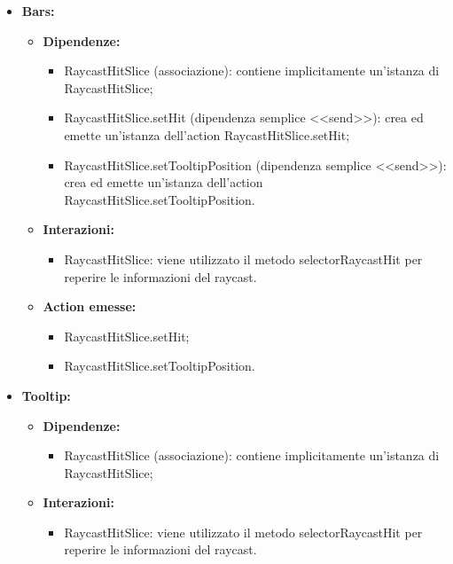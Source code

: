 \begin{itemize}
    \item \textbf{Bars:}
          \begin{itemize}
              \item \textbf{Dipendenze:}
                    \begin{itemize}
                        \item RaycastHitSlice (associazione): contiene implicitamente un'istanza di
                              RaycastHitSlice;
                        \item RaycastHitSlice.setHit (dipendenza semplice <<send>>): crea ed emette
                              un'istanza dell'action RaycastHitSlice.setHit;
                        \item RaycastHitSlice.setTooltipPosition (dipendenza semplice <<send>>): crea ed
                              emette un'istanza dell'action RaycastHitSlice.setTooltipPosition.
                    \end{itemize}
              \item \textbf{Interazioni:}
                    \begin{itemize}
                        \item RaycastHitSlice: viene utilizzato il metodo selectorRaycastHit per reperire le
                              informazioni del raycast.
                    \end{itemize}
              \item \textbf{Action emesse:}
                    \begin{itemize}
                        \item RaycastHitSlice.setHit;
                        \item RaycastHitSlice.setTooltipPosition.
                    \end{itemize}
          \end{itemize}

    \item \textbf{Tooltip:}
          \begin{itemize}
              \item \textbf{Dipendenze:}
                    \begin{itemize}
                        \item RaycastHitSlice (associazione): contiene implicitamente un'istanza di
                              RaycastHitSlice;
                    \end{itemize}
              \item \textbf{Interazioni:}
                    \begin{itemize}
                        \item RaycastHitSlice: viene utilizzato il metodo selectorRaycastHit per reperire le
                              informazioni del raycast.
                    \end{itemize}
          \end{itemize}
\end{itemize}

